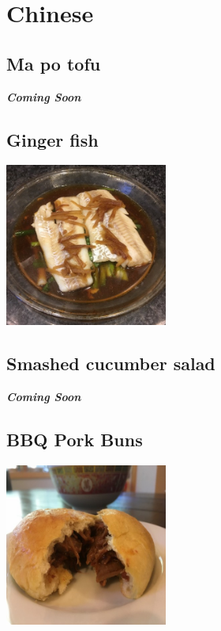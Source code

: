 \documentclass[
]{book}
\begin{document}
\hypertarget{chinese}{%
\section*{Chinese}\label{chinese}}

\hypertarget{mapotofu}{%
\subsection*{Ma po tofu}\label{mapotofu}}

\textbf{\emph{Coming Soon}}

\hypertarget{gingerfish}{%
\subsection*{Ginger fish}\label{gingerfish}}

\includegraphics[width=0.4\textwidth,height=\textheight]{ginger_fish_small.jpg}

\hypertarget{cucsalad}{%
\subsection*{Smashed cucumber salad}\label{cucsalad}}

\textbf{\emph{Coming Soon}}

\hypertarget{bbq}{%
\subsection*{BBQ Pork Buns}\label{bbq}}

\includegraphics[width=0.4\textwidth,height=\textheight]{bbq_pork_buns_small.jpg}
\end{document}
